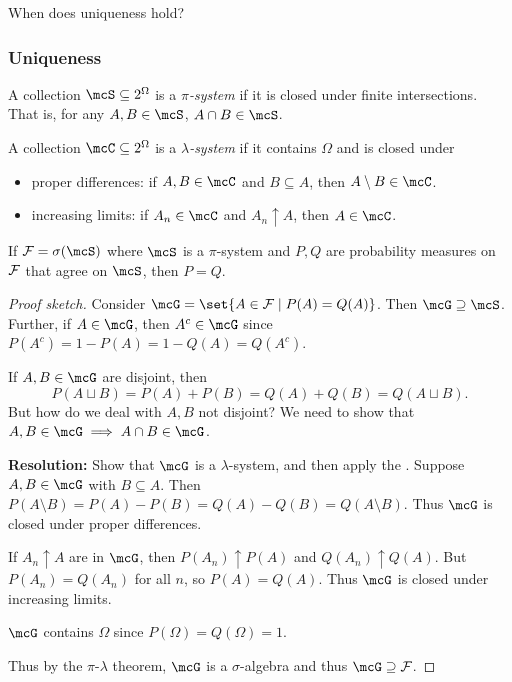 When does uniqueness hold?
\subsubsection{Uniqueness}
\begin{definition*}[$\pi$-system] \label{def:pi}
    A collection $\mcS \subseteq 2^\Omega$ is a \emph{$\pi$-system}
    if it is closed under finite intersections.
    That is, for any $A, B \in \mcS$, $A \cap B \in \mcS$.
\end{definition*}
\begin{definition*} \label{def:lambda}
    A collection $\mcC \subseteq 2^\Omega$ is a \emph{$\lambda$-system}
    if it contains $\Omega$ and is closed under
    \begin{itemize}
        \item proper differences: if $A, B \in \mcC$ and $B \subseteq A$,
            then $A \setminus B \in \mcC$.
        \item increasing limits: if $A_n \in \mcC$ and $A_n \uparrow A$,
            then $A \in \mcC$.
    \end{itemize}
\end{definition*}

\begin{theorem} \label{thm:unique}
    If $\F = \sigma(\mcS)$ where $\mcS$ is a $\pi$-system and
    $P, Q$ are probability measures on $\mathcal F$ that agree on $\mcS$,
    then $P = Q$.
\end{theorem}
\begin{proof}[Proof sketch]
    Consider $\mcG = \set{A \in \F \mid P(A) = Q(A)}$.
    Then $\mcG \supseteq \mcS$.
    Further, if $A \in \mcG$, then $A^c \in \mcG$
    since $P(A^c) = 1 - P(A) = 1 - Q(A) = Q(A^c)$.

    If $A, B \in \mcG$ are disjoint, then \[
        P(A \sqcup B) = P(A) + P(B) = Q(A) + Q(B) = Q(A \sqcup B).
    \] But how do we deal with $A, B$ not disjoint?
    We need to show that $A, B \in \mcG \implies A \cap B \in \mcG$.

    \textbf{Resolution:} Show that $\mcG$ is a $\lambda$-system,
    and then apply the .
    Suppose $A, B \in \mcG$ with $B \subseteq A$.
    Then $P(A \setminus B) = P(A) - P(B) = Q(A) - Q(B) = Q(A \setminus B)$.
    Thus $\mcG$ is closed under proper differences.

    If $A_n \uparrow A$ are in $\mcG$, then $P(A_n) \uparrow P(A)$ and
    $Q(A_n) \uparrow Q(A)$.
    But $P(A_n) = Q(A_n)$ for all $n$, so $P(A) = Q(A)$.
    Thus $\mcG$ is closed under increasing limits.

    $\mcG$ contains $\Omega$ since $P(\Omega) = Q(\Omega) = 1$.

    Thus by the $\pi$-$\lambda$ theorem, $\mcG$ is a $\sigma$-algebra
    and thus $\mcG \supseteq \F$.
\end{proof}

